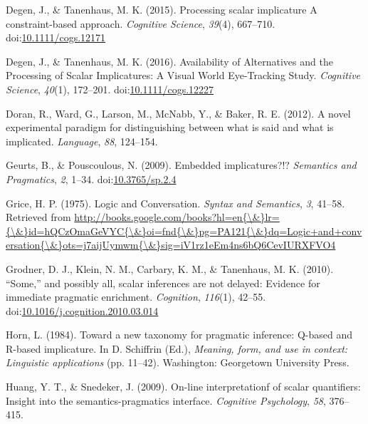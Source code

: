 \documentclass[floatsintext,man]{apa6}
\theoremstyle{definition}
\theoremstyle{definition}
\theoremstyle{definition}
\theoremstyle{remark}
\begin{document}
\hypertarget{ref-DegenTanenhaus2015}{}
Degen, J., \& Tanenhaus, M. K. (2015). Processing scalar implicature A
constraint-based approach. \emph{Cognitive Science}, \emph{39}(4),
667--710.
doi:\href{https://doi.org/10.1111/cogs.12171}{10.1111/cogs.12171}

\hypertarget{ref-DegenTanenhaus2016}{}
Degen, J., \& Tanenhaus, M. K. (2016). Availability of Alternatives and
the Processing of Scalar Implicatures: A Visual World Eye-Tracking
Study. \emph{Cognitive Science}, \emph{40}(1), 172--201.
doi:\href{https://doi.org/10.1111/cogs.12227}{10.1111/cogs.12227}

\hypertarget{ref-Doran2012}{}
Doran, R., Ward, G., Larson, M., McNabb, Y., \& Baker, R. E. (2012). A
novel experimental paradigm for distinguishing between what is said and
what is implicated. \emph{Language}, \emph{88}, 124--154.

\hypertarget{ref-Geurts2009}{}
Geurts, B., \& Pouscoulous, N. (2009). Embedded implicatures?!?
\emph{Semantics and Pragmatics}, \emph{2}, 1--34.
doi:\href{https://doi.org/10.3765/sp.2.4}{10.3765/sp.2.4}

\hypertarget{ref-grice1975}{}
Grice, H. P. (1975). Logic and Conversation. \emph{Syntax and
Semantics}, \emph{3}, 41--58. Retrieved from
\href{http://books.google.com/books?hl=en\%7B/\&\%7Dlr=\%7B/\&\%7Did=hQCzOmaGeVYC\%7B/\&\%7Doi=fnd\%7B/\&\%7Dpg=PA121\%7B/\&\%7Ddq=Logic+and+conversation\%7B/\&\%7Dots=j7aijUymwm\%7B/\&\%7Dsig=iV1rz1eEm4ns6bQ6CevIURXFVO4}{http://books.google.com/books?hl=en\{\textbackslash{}\&\}lr=\{\textbackslash{}\&\}id=hQCzOmaGeVYC\{\textbackslash{}\&\}oi=fnd\{\textbackslash{}\&\}pg=PA121\{\textbackslash{}\&\}dq=Logic+and+conversation\{\textbackslash{}\&\}ots=j7aijUymwm\{\textbackslash{}\&\}sig=iV1rz1eEm4ns6bQ6CevIURXFVO4}

\hypertarget{ref-Grodner2010}{}
Grodner, D. J., Klein, N. M., Carbary, K. M., \& Tanenhaus, M. K.
(2010). ``Some,'' and possibly all, scalar inferences are not delayed:
Evidence for immediate pragmatic enrichment. \emph{Cognition},
\emph{116}(1), 42--55.
doi:\href{https://doi.org/10.1016/j.cognition.2010.03.014}{10.1016/j.cognition.2010.03.014}

\hypertarget{ref-horn1984}{}
Horn, L. (1984). Toward a new taxonomy for pragmatic inference: Q-based
and R-based implicature. In D. Schiffrin (Ed.), \emph{Meaning, form, and
use in context: Linguistic applications} (pp. 11--42). Washington:
Georgetown University Press.

\hypertarget{ref-huang2009}{}
Huang, Y. T., \& Snedeker, J. (2009). On-line interpretationf of scalar
quantifiers: Insight into the semantics-pragmatics interface.
\emph{Cognitive Psychology}, \emph{58}, 376--415.
\end{document}
